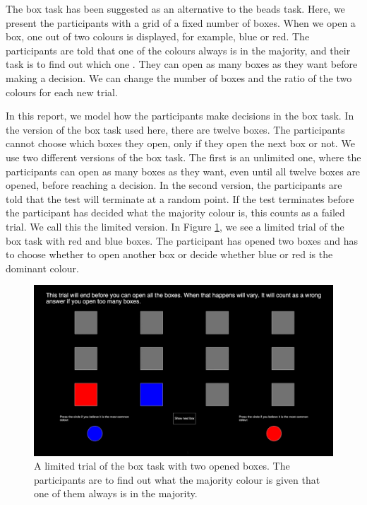 The box task has been suggested as an alternative to the beads task. Here, we present the participants with a grid of a fixed number of boxes. When we open a box, one out of two colours is displayed, for example, blue or red. The participants are told that one of the colours always is in the majority, and their task is to find out which one \citep{moritz2017}. They can open as many boxes as they want before making a decision. We can change the number of boxes and the ratio of the two colours for each new trial. 

In this report, we model how the participants make decisions in the box task. In the version of the box task used here, there are twelve boxes.
The participants cannot choose which boxes they open, only if they open the next box or not. We use two different versions of the box task. The first is an unlimited one, where the participants can open as many boxes as they want, even until all twelve boxes are opened, before reaching a decision. In the second version, the participants are told that the test will terminate at a random point. If the test terminates before the participant has decided what the majority colour is, this counts as a failed trial. We call this the limited version. In Figure \ref{picture_of_box_task}, we see a limited trial of the box task with red and blue boxes. The participant has opened two boxes and has to choose whether to open another box or decide whether blue or red is the dominant colour. 
\begin{figure}
    \centering
    \includegraphics[scale=0.486]{Sections/Box task 2.png}
    \caption[A Limited Trial of the Box Task Visualised]{A limited trial of the box task with two opened boxes. The participants are to find out what the majority colour is given that one of them always is in the majority.}
    \label{picture_of_box_task}
\end{figure}

